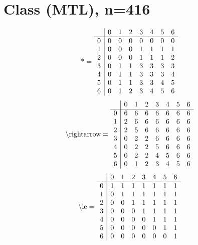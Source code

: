 \documentclass[11pt]{article}
\begin{document}
\section{Class (MTL), n=416}
\[\text{*} = 
\begin{array}{r | r r r r r r r}
 & 0 & 1 & 2 & 3 & 4 & 5 & 6 \\ \hline
0 & 0 & 0 & 0 & 0 & 0 & 0 & 0 \\
1 & 0 & 0 & 0 & 1 & 1 & 1 & 1 \\
2 & 0 & 0 & 0 & 1 & 1 & 1 & 2 \\
3 & 0 & 1 & 1 & 3 & 3 & 3 & 3 \\
4 & 0 & 1 & 1 & 3 & 3 & 3 & 4 \\
5 & 0 & 1 & 1 & 3 & 3 & 4 & 5 \\
6 & 0 & 1 & 2 & 3 & 4 & 5 & 6 \\
\end{array}
\]
\[\text{\textbackslash rightarrow} = 
\begin{array}{r | r r r r r r r}
 & 0 & 1 & 2 & 3 & 4 & 5 & 6 \\ \hline
0 & 6 & 6 & 6 & 6 & 6 & 6 & 6 \\
1 & 2 & 6 & 6 & 6 & 6 & 6 & 6 \\
2 & 2 & 5 & 6 & 6 & 6 & 6 & 6 \\
3 & 0 & 2 & 2 & 6 & 6 & 6 & 6 \\
4 & 0 & 2 & 2 & 5 & 6 & 6 & 6 \\
5 & 0 & 2 & 2 & 4 & 5 & 6 & 6 \\
6 & 0 & 1 & 2 & 3 & 4 & 5 & 6 \\
\end{array}
\]
\[\text{\textbackslash le} = 
\begin{array}{r | r r r r r r r}
 & 0 & 1 & 2 & 3 & 4 & 5 & 6 \\ \hline
0 & 1 & 1 & 1 & 1 & 1 & 1 & 1 \\
1 & 0 & 1 & 1 & 1 & 1 & 1 & 1 \\
2 & 0 & 0 & 1 & 1 & 1 & 1 & 1 \\
3 & 0 & 0 & 0 & 1 & 1 & 1 & 1 \\
4 & 0 & 0 & 0 & 0 & 1 & 1 & 1 \\
5 & 0 & 0 & 0 & 0 & 0 & 1 & 1 \\
6 & 0 & 0 & 0 & 0 & 0 & 0 & 1 \\
\end{array}
\]
\end{document}
